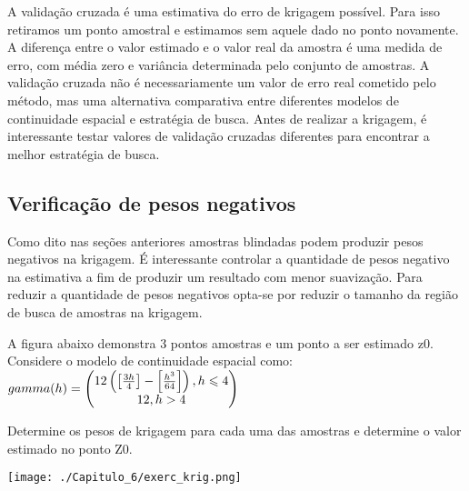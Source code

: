 A validação cruzada é uma estimativa do erro de krigagem possível. Para isso retiramos um ponto amostral e estimamos sem aquele dado no ponto novamente. A diferença entre o valor estimado e o valor real da amostra é uma medida de erro, com média zero e variância determinada pelo conjunto de amostras. A validação cruzada não é necessariamente um valor de erro real cometido pelo método, mas uma alternativa comparativa entre diferentes modelos de continuidade espacial e estratégia de busca. Antes de realizar a krigagem, é interessante testar valores de validação cruzadas diferentes para encontrar a melhor estratégia de busca. 

\subsection{Verificação de pesos negativos}

Como dito nas seções anteriores amostras blindadas podem produzir pesos negativos na krigagem. É interessante controlar a quantidade de pesos negativo na estimativa a fim de produzir um resultado com menor suavização. Para reduzir a quantidade de pesos negativos opta-se por reduzir o tamanho da região de busca de amostras na krigagem. 

\begin{exercise}
	A figura abaixo demonstra 3 pontos amostras e um ponto a ser estimado z0. Considere o modelo de continuidade espacial como: \\
	
	\vspace{0.5cm}
	 $\\gamma (h) = \begin{pmatrix}
	12\left(\left [ \frac{3h}{4} \right ]-\left [ \frac{h^{3}}{64} \right ]\right), h\leqslant 4\\
	12,h> 4
	
	\end{pmatrix}$
	\vspace{0.5cm}
	
	Determine os pesos de krigagem para cada uma das amostras e determine o valor estimado no ponto Z0.
	
	\vspace{0.5cm}
	
	\centering
	\texttt{[image: ./Capitulo\_6/exerc\_krig.png]}
\end{exercise}